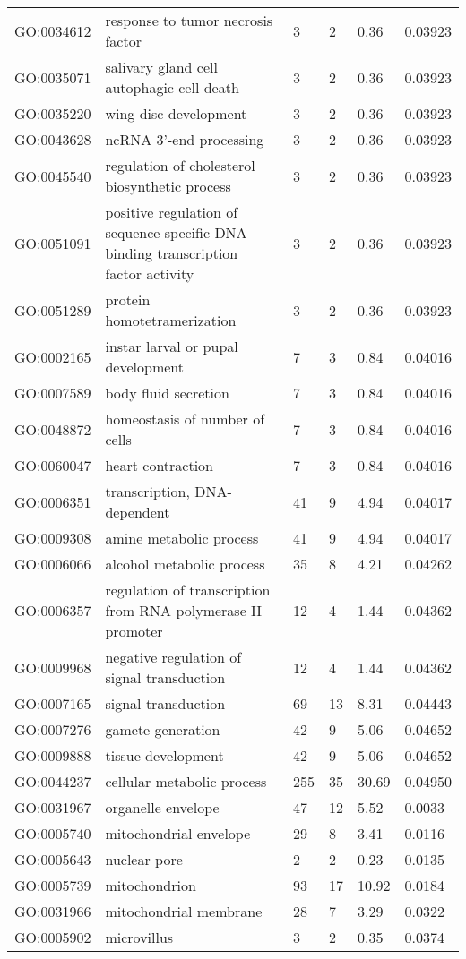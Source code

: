 \documentclass[10pt]{bmc_article}
\newenvironment{bmcformat}{\begin{raggedright}\baselineskip20pt\sloppy\setboolean{publ}{false}}{\end{raggedright}\baselineskip20pt\sloppy}
\begin{document}
\begin{bmcformat}
\begin{longtable}{lp{4.5cm}llll}
  GO:0034612 & response to tumor necrosis factor &   3 &   2 & 0.36 & 0.03923 \\ 
  GO:0035071 & salivary gland cell autophagic cell death &   3 &   2 & 0.36 & 0.03923 \\ 
  GO:0035220 & wing disc development &   3 &   2 & 0.36 & 0.03923 \\ 
  GO:0043628 & ncRNA 3'-end processing &   3 &   2 & 0.36 & 0.03923 \\ 
  GO:0045540 & regulation of cholesterol biosynthetic process &   3 &   2 & 0.36 & 0.03923 \\ 
  GO:0051091 & positive regulation of sequence-specific DNA binding transcription factor activity &   3 &   2 & 0.36 & 0.03923 \\ 
  GO:0051289 & protein homotetramerization &   3 &   2 & 0.36 & 0.03923 \\ 
  GO:0002165 & instar larval or pupal development &   7 &   3 & 0.84 & 0.04016 \\ 
  GO:0007589 & body fluid secretion &   7 &   3 & 0.84 & 0.04016 \\ 
  GO:0048872 & homeostasis of number of cells &   7 &   3 & 0.84 & 0.04016 \\ 
  GO:0060047 & heart contraction &   7 &   3 & 0.84 & 0.04016 \\ 
  GO:0006351 & transcription, DNA-dependent &  41 &   9 & 4.94 & 0.04017 \\ 
  GO:0009308 & amine metabolic process &  41 &   9 & 4.94 & 0.04017 \\ 
  GO:0006066 & alcohol metabolic process &  35 &   8 & 4.21 & 0.04262 \\ 
  GO:0006357 & regulation of transcription from RNA polymerase II promoter &  12 &   4 & 1.44 & 0.04362 \\ 
  GO:0009968 & negative regulation of signal transduction &  12 &   4 & 1.44 & 0.04362 \\ 
  GO:0007165 & signal transduction &  69 &  13 & 8.31 & 0.04443 \\ 
  GO:0007276 & gamete generation &  42 &   9 & 5.06 & 0.04652 \\ 
  GO:0009888 & tissue development &  42 &   9 & 5.06 & 0.04652 \\ 
  GO:0044237 & cellular metabolic process & 255 &  35 & 30.69 & 0.04950 \\ 
   \hline
GO:0031967 & organelle envelope &  47 &  12 & 5.52 & 0.0033 \\ 
  GO:0005740 & mitochondrial envelope &  29 &   8 & 3.41 & 0.0116 \\ 
  GO:0005643 & nuclear pore &   2 &   2 & 0.23 & 0.0135 \\ 
  GO:0005739 & mitochondrion &  93 &  17 & 10.92 & 0.0184 \\ 
  GO:0031966 & mitochondrial membrane &  28 &   7 & 3.29 & 0.0322 \\ 
  GO:0005902 & microvillus &   3 &   2 & 0.35 & 0.0374 \\ 
   \hline
\hline
\end{longtable}


\end{bmcformat}
\end{document}
